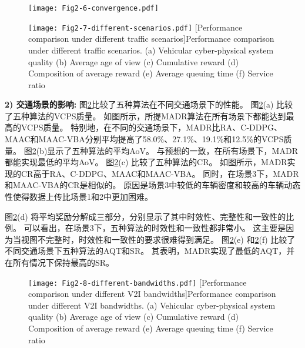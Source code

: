 \begin{figure}[h]
\centering
  \texttt{[image: Fig2-6-convergence.pdf]}
  \label{fig 2-6}
\end{figure} 

\begin{figure}[h]
  \centering
  \texttt{[image: Fig2-7-different-scenarios.pdf]}
  [Performance comparison under different traffic scenarios]{Performance comparison under different traffic scenarios. (a) Vehicular cyber-physical system quality (b) Average age of view (c) Cumulative reward (d) Composition of average reward (e) Average queuing time (f) Service ratio}
  \label{fig 2-7}
\end{figure}

\textbf{2) 交通场景的影响:}
图\ref{fig 2-7}比较了五种算法在不同交通场景下的性能。
图\ref{fig 2-7}(a) 比较了五种算法的VCPS质量。
如图所示，所提MADR算法在所有场景下都能达到最高的VCPS质量。
特别地，在不同的交通场景下，MADR比RA、C-DDPG、MAAC和MAAC-VBA分别平均提高了58.0\%、27.1\%、19.1\%和12.5\%的VCPS质量。
图\ref{fig 2-7}(b)显示了五种算法的平均AoV。
与预想的一致，在所有场景下，MADR都能实现最低的平均AoV。
图\ref{fig 2-7}(c) 比较了五种算法的CR。
如图所示，MADR实现的CR高于RA、C-DDPG、MAAC和MAAC-VBA。
同时，在场景3下，MADR和MAAC-VBA的CR是相似的。
原因是场景3中较低的车辆密度和较高的车辆动态性使得数据上传比场景1和2中更加困难。

图\ref{fig 2-7}(d) 将平均奖励分解成三部分，分别显示了其中时效性、完整性和一致性的比例。
可以看出，在场景3下，五种算法的时效性和一致性都非常小。
这主要是因为当视图不完整时，时效性和一致性的要求很难得到满足。
图\ref{fig 2-7}(e) 和\ref{fig 2-7}(f) 比较了不同交通场景下五种算法的AQT和SR。
其表明，MADR实现了最低的AQT，并在所有情况下保持最高的SR。

\begin{figure}[h]
  \centering
  \texttt{[image: Fig2-8-different-bandwidths.pdf]}
  [Performance comparison under different V2I bandwidths]{Performance comparison under different V2I bandwidths. (a) Vehicular cyber-physical system quality (b) Average age of view (c) Cumulative reward (d) Composition of average reward (e) Average queuing time (f) Service ratio}
  \label{fig 2-8}
\end{figure}

